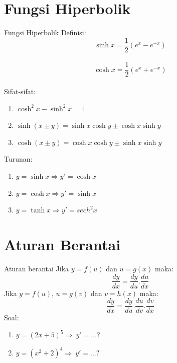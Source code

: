 \documentclass{beamer}
\begin{document}
\section{Fungsi Hiperbolik}
\begin{frame}[t, fragile]{Fungsi Hiperbolik}
Definisi:\\
$$\sinh x=\dfrac{1}{2}(e^x - e^ {-x})$$\\
$$\cosh x=\dfrac{1}{2}(e^x + e^ {-x})$$\\
Sifat-sifat:\\
\begin{enumerate}
\item $\cosh^2 x - \sinh^2 x=1$
\item $\sinh (x \pm y) = \sinh x \cosh y \pm \cosh x \sinh y$
\item $\cosh (x \pm y) = \cosh x \cosh y \pm \sinh x \sinh y$
\end{enumerate}
Turunan:\\
\begin{enumerate}
\item $y=\sinh x \Longrightarrow y'=\cosh x$
\item $y=\cosh x \Longrightarrow y'=\sinh x$
\item $y=\tanh x \Longrightarrow y'=sech ^2 x$
\end{enumerate}
\end{frame}

\section{Aturan Berantai}
\begin{frame}[t, fragile]{Aturan berantai}
Jika $y=f(u)$ dan $u=g(x)$ maka:\\
$$\dfrac{dy}{dx}=\dfrac{dy}{du}.\dfrac{du}{dx}$$
Jika $y=f(u)$, $u=g(v)$ dan $v=h(x)$ maka:\\
$$\dfrac{dy}{dx}=\dfrac{dy}{du}.\dfrac{du}{dv}.\dfrac{dv}{dx}$$
\underline{Soal:}\\
\begin{enumerate}
\item $y=(2x+5)^5 \Longrightarrow~ y'=...?$
\item $y=(x^2+2)^4 \Longrightarrow~ y'=...?$
\end{enumerate}
\end{frame}
\end{document}
